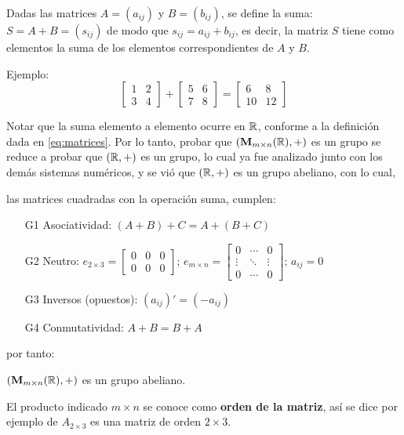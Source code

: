 Dadas las matrices $A = (a_{ij})$ y $B = (b_{ij})$, se define la suma: $S = A + B = (s_{ij})$ de modo que $s_{ij} = a_{ij} + b_{ij}$, es decir, la matriz $S$ tiene como elementos la suma de los elementos correspondientes de $A$ y $B$.

Ejemplo:
\[ \begin{bmatrix}
	1 & 2\\
	3 & 4
\end{bmatrix} + \begin{bmatrix}
	5 & 6\\
	7 & 8
\end{bmatrix} = \begin{bmatrix}
	6 & 8\\
	10 & 12
\end{bmatrix} \]

Notar que la suma elemento a elemento ocurre en $\mathbb{R}$, conforme a la definición dada en \eqref{eq:matrices}. Por lo tanto, probar que $(\mathbf{M}_{m\times n}(\mathbb{R}), +)$ es un grupo se reduce a probar que $(\mathbb{R}, +)$ es un grupo, lo cual ya fue analizado junto con los demás sistemas numéricos, y se vió que $(\mathbb{R}, +)$ es un grupo abeliano, con lo cual,

las matrices cuadradas con la operación suma, cumplen:
\begin{itemize}
	\item[G1] Asociatividad: $(A + B) + C = A + (B + C)$ \quad \cmark 
	\item[G2] Neutro: $e_{2\times 3} = \begin{bmatrix} 0 & 0 & 0\\0 & 0 & 0 \end{bmatrix}$;
	$e_{m \times n} = \begin{bmatrix} 0 & \cdots & 0\\ \vdots & \ddots & \vdots\\ 0 & \cdots & 0 \end{bmatrix}$; $a_{ij} = 0$ \quad \cmark 
	\item[G3] Inversos (opuestos):  $(a_{ij})' = (-a_{ij})$ \quad \cmark 
	\item[G4] Conmutatividad: $A + B = B + A$ \quad \cmark 
\end{itemize}
por tanto:

\begin{center}
	$\left( \mathbf{M}_{m \times n}(\mathbb{R}), + \right)$ es un grupo abeliano.
\end{center}

El producto indicado $m \times n$ se conoce como \textbf{orden de la matriz}, así se dice por ejemplo de $A_{2 \times 3}$ es una matriz de orden $2 \times 3$.

